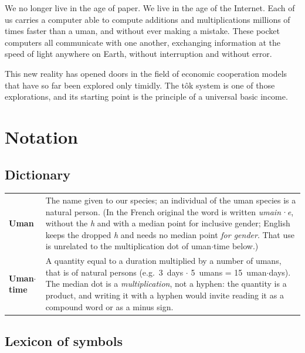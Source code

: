 \documentclass[letterpaper]{article}
\begin{document}
We no longer live in the age of paper. We live in the age of the Internet. Each of us
carries a computer able to compute additions and multiplications millions of times faster
than a uman, and without ever making a mistake. These pocket computers all communicate
with one another, exchanging information at the speed of light anywhere on Earth, without
interruption and without error.

This new reality has opened doors in the field of economic cooperation models that have
so far been explored only timidly. The t\^{o}k system is one of those explorations, and
its starting point is the principle of a universal basic income.

\section{Notation}

\subsection{Dictionary}

\begin{tabularx}{\textwidth}{lX}
    \textbf{Uman} & The name given to our species; an individual of the uman species is a
    natural person. (In the French original the word is written \emph{umain·e}, without
    the \emph{h} and with a median point for inclusive gender; English keeps the dropped
    \emph{h} and needs no median point \emph{for gender}. That use is unrelated to the
    multiplication dot of uman$\cdot$time below.)\\
    \textbf{Uman$\cdot$time} & A quantity equal to a duration multiplied by a number of
    umans, that is of natural persons (e.g.\ 3~days $\cdot$ 5~umans = 15~uman$\cdot$days).
    The median dot is a \emph{multiplication}, not a hyphen: the quantity is a product,
    and writing it with a hyphen would invite reading it as a compound word or as a minus
    sign.
\end{tabularx}

\subsection{Lexicon of symbols}
\end{document}
